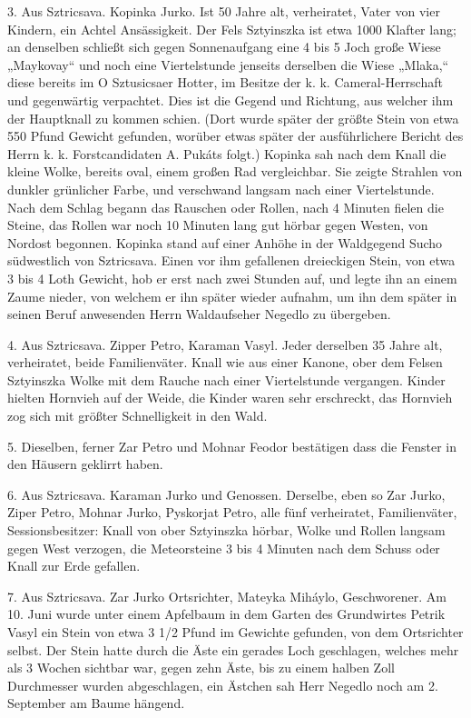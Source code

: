 \documentclass[a4paper, 11pt, oneside, german]{article}
\begin{document}
3. Aus Sztricsava. Kopinka Jurko. Ist 50 Jahre alt, verheiratet, Vater von vier Kindern, ein Achtel Ansässigkeit. Der Fels Sztyinszka ist etwa 1000 Klafter lang; an denselben schließt sich gegen Sonnenaufgang eine 4 bis 5 Joch große Wiese „Maykovay“ und noch eine Viertelstunde jenseits derselben die Wiese „Mlaka,“ diese bereits im O Sztusicsaer Hotter, im Besitze der k. k. Cameral-Herrschaft und gegenwärtig verpachtet. Dies ist die Gegend und Richtung, aus welcher ihm der Hauptknall zu kommen schien. (Dort wurde später der größte Stein von etwa 550 Pfund Gewicht gefunden, worüber etwas später der ausführlichere Bericht des Herrn k. k. Forstcandidaten A. Pukáts folgt.) Kopinka sah nach dem Knall die kleine Wolke, bereits oval, einem großen Rad vergleichbar. Sie zeigte Strahlen von dunkler grünlicher Farbe, und verschwand langsam nach einer Viertelstunde. Nach dem Schlag begann das Rauschen oder Rollen, nach 4 Minuten fielen die Steine, das Rollen war noch 10 Minuten lang gut hörbar gegen Westen, von Nordost begonnen. Kopinka stand auf einer Anhöhe in der Waldgegend Sucho südwestlich von Sztricsava. Einen vor ihm gefallenen dreieckigen Stein, von etwa 3 bis 4 Loth Gewicht, hob er erst nach zwei Stunden auf, und legte ihn an einem Zaume nieder, von welchem er ihn später wieder aufnahm, um ihn dem später in seinen Beruf anwesenden Herrn Waldaufseher Negedlo zu übergeben.

4. Aus Sztricsava. Zipper Petro, Karaman Vasyl. Jeder derselben 35 Jahre alt, verheiratet, beide Familienväter. Knall wie aus einer Kanone, ober dem Felsen Sztyinszka Wolke mit dem Rauche nach einer Viertelstunde vergangen. Kinder hielten Hornvieh auf der Weide, die Kinder waren sehr erschreckt, das Hornvieh zog sich mit größter Schnelligkeit in den Wald.

5. Dieselben, ferner Zar Petro und Mohnar Feodor bestätigen dass die Fenster in den Häusern geklirrt haben.

6. Aus Sztricsava. Karaman Jurko und Genossen. Derselbe, eben so Zar Jurko, Ziper Petro, Mohnar Jurko, Pyskorjat Petro, alle fünf verheiratet, Familienväter, Sessionsbesitzer: Knall von ober Sztyinszka hörbar, Wolke und Rollen langsam gegen West verzogen, die Meteorsteine 3 bis 4 Minuten nach dem Schuss oder Knall zur Erde gefallen.

7. Aus Sztricsava. Zar Jurko Ortsrichter, Mateyka Miháylo, Geschworener. Am 10. Juni wurde unter einem Apfelbaum in dem Garten des Grundwirtes Petrik Vasyl ein Stein von etwa 3 1/2 Pfund im Gewichte gefunden, von dem Ortsrichter selbst. Der Stein hatte durch die Äste ein gerades Loch geschlagen, welches mehr als 3 Wochen sichtbar war, gegen zehn Äste, bis zu einem halben Zoll Durchmesser wurden abgeschlagen, ein Ästchen sah Herr Negedlo noch am 2. September am Baume hängend.
\end{document}
